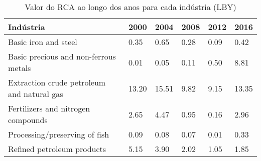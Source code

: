 \begin{table}
\centering
\caption{Valor do RCA ao longo dos anos para cada indústria (LBY)}
\label{tab:ex3-tempo-LBY}
\begin{tabular}{p{6cm}p{1.5cm}p{1.5cm}p{1.5cm}p{1.5cm}p{1.5cm}}
\toprule
                                 Indústria &  2000 &  2004 & 2008 & 2012 &  2016 \\
\midrule
                      Basic iron and steel &  0.35 &  0.65 & 0.28 & 0.09 &  0.42 \\
     Basic precious and non-ferrous metals &  0.01 &  0.05 & 0.11 & 0.50 &  8.81 \\
Extraction crude petroleum and natural gas & 13.20 & 15.51 & 9.82 & 9.15 & 13.35 \\
        Fertilizers and nitrogen compounds &  2.65 &  4.47 & 0.95 & 0.16 &  2.96 \\
             Processing/preserving of fish &  0.09 &  0.08 & 0.07 & 0.01 &  0.33 \\
                Refined petroleum products &  5.15 &  3.90 & 2.02 & 1.05 &  1.85 \\
\bottomrule
\end{tabular}
\end{table}
